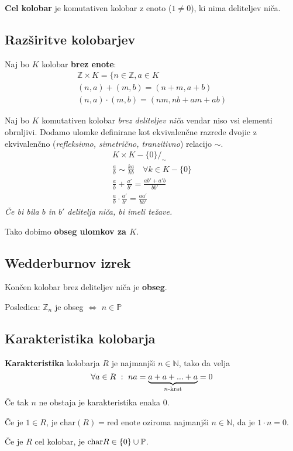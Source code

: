\textbf{Cel kolobar} je komutativen kolobar z enoto ($1\neq0$), ki nima deliteljev niča.

\subsection*{Razširitve kolobarjev}
Naj bo $K$ kolobar \textbf{brez enote}:
\begin{gather*}
	\mathbb{Z} \times K = \{ n \in \mathbb{Z}, a \in K \\
	(n,a) + (m,b) = (n+m, a+b) \\
	(n,a) \cdot (m,b) = (nm, nb+am+ab)
\end{gather*}

Naj bo $K$ komutativen kolobar \emph{brez deliteljev niča} vendar niso vsi elementi obrnljivi. Dodamo ulomke definirane kot ekvivalenčne razrede dvojic z ekvivalenčno (\emph{refleksivno, simetrično, tranzitivno}) relacijo $\sim$.
\begin{gather*}
	K \times K-\{0\} \Big/_\sim\\
	\frac{a}{b} \sim \frac{ka}{kb} \quad \forall k \in K-\{0\} \\
	\frac{a}{b} + \frac{a'}{b'} = \frac{ab' + a'b}{bb'}\\
	\frac{a}{b} \cdot \frac{a'}{b'} = \frac{aa'}{bb'}
\end{gather*}
\emph{Če bi bila $b$ in $b'$ delitelja niča, bi imeli težave.}

Tako dobimo \textbf{obseg ulomkov za $K$}.

\subsection*{Wedderburnov izrek}
Končen kolobar brez deliteljev niča je \textbf{obseg}.

Posledica:
$\mathbb{Z}_n$ je obseg $\iff$ $n\in\mathbb{P}$

\subsection*{Karakteristika kolobarja}
\textbf{Karakteristika} kolobarja $R$ je najmanjši $n\in \mathbb{N}$, tako da velja 
\[\forall a \in R\ :\ na = \underbrace{a+a+...+a}_{n\textmd{-krat}} = 0\]
Če tak $n$ ne obstaja je karakteristika enaka $0$.

Če je $1 \in R$, je $\text{char}(R) = \text{red enote}$ oziroma najmanjši $n \in \mathbb{N}$, da je $1\cdot n = 0$. 

Če je $R$ cel kolobar, je $\textmd{char}R \in \{0\} \cup \mathbb{P}$.

